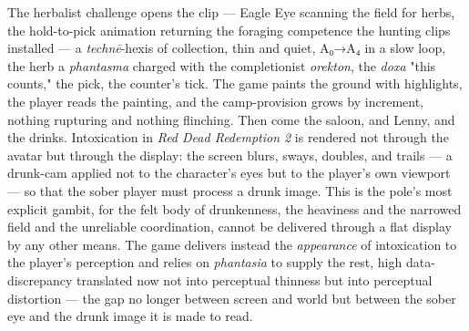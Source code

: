 \documentclass{article}
\begin{document}
The herbalist challenge opens the clip — Eagle Eye scanning the field for herbs, the hold-to-pick animation returning the foraging competence the hunting clips installed — a \textit{technē}-hexis of collection, thin and quiet, A₀→A₄ in a slow loop, the herb a \textit{phantasma} charged with the completionist \textit{orekton}, the \textit{doxa} "this counts," the pick, the counter's tick. The game paints the ground with highlights, the player reads the painting, and the camp-provision grows by increment, nothing rupturing and nothing flinching. Then come the saloon, and Lenny, and the drinks. Intoxication in \textit{Red Dead Redemption 2} is rendered not through the avatar but through the display: the screen blurs, sways, doubles, and trails — a drunk-cam applied not to the character's eyes but to the player's own viewport — so that the sober player must process a drunk image. This is the pole's most explicit gambit, for the felt body of drunkenness, the heaviness and the narrowed field and the unreliable coordination, cannot be delivered through a flat display by any other means. The game delivers instead the \textit{appearance} of intoxication to the player's perception and relies on \textit{phantasia} to supply the rest, high data-discrepancy translated now not into perceptual thinness but into perceptual distortion — the gap no longer between screen and world but between the sober eye and the drunk image it is made to read.
\end{document}
